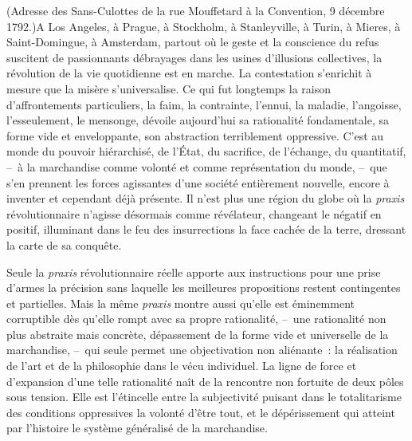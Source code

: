 \documentclass[french,twoside]{book} %
\begin{document}
{\citbibl (Adresse des Sans-Culottes de la rue Mouffetard à la Convention, 9 décembre 1792.)}\noindent A Los Angeles, à Prague, à Stockholm, à Stanleyville, à Turin, à Mieres, à Saint-Domingue, à Amsterdam, partout où le geste et la conscience du refus suscitent de passionnants débrayages dans les usines d’illusions collectives, la révolution de la vie quotidienne est en marche. La contestation s’enrichit à mesure que la misère s’universalise. Ce qui fut longtemps la raison d’affrontements particuliers, la faim, la contrainte, l’ennui, la maladie, l’angoisse, l’esseulement, le mensonge, dévoile aujourd’hui sa rationalité fondamentale, sa forme vide et enveloppante, son abstraction terriblement oppressive. C’est au monde du pouvoir hiérarchisé, de l’État, du sacrifice, de l’échange, du quantitatif, – à la marchandise comme volonté et comme représentation du monde, – que s’en prennent les forces agissantes d’une société entièrement nouvelle, encore à inventer et cependant déjà présente. Il n’est plus une région du globe où la \emph{praxis} révolutionnaire n’agisse désormais comme révélateur, changeant le négatif en positif, illuminant dans le feu des insurrections la face cachée de la terre, dressant la carte de sa conquête.\par
Seule la \emph{praxis} révolutionnaire réelle apporte aux instructions pour une prise d’armes la précision sans laquelle les meilleures propositions restent contingentes et partielles. Mais la même \emph{praxis} montre aussi qu’elle est éminemment corruptible dès qu’elle rompt avec sa propre rationalité, – une rationalité non plus abstraite mais concrète, dépassement de la forme vide et universelle de la marchandise, – qui seule permet une objectivation non aliénante : la réalisation de l’art et de la philosophie dans le vécu individuel. La ligne de force et d’expansion d’une telle rationalité naît de la rencontre non fortuite de deux pôles sous tension. Elle est l’étincelle entre la subjectivité puisant dans le totalitarisme des conditions oppressives la volonté d’être tout, et le dépérissement qui atteint par l’histoire le système généralisé de la marchandise.\par
\end{document}
